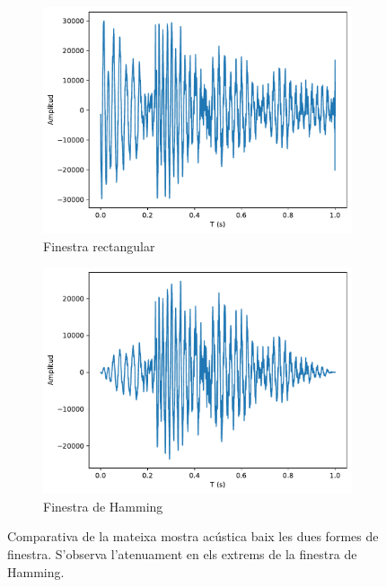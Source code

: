         \begin{figure}[!ht]
             \centering
             \begin{subfigure}{0.4\textwidth}
                 \centering
                 \includegraphics[width=\textwidth]{figuras/finestra_rect.pdf}
                 \caption{Finestra rectangular}
             \end{subfigure}
             \begin{subfigure}{0.4\textwidth}
                 \centering
                 \includegraphics[width=\textwidth]{figuras/finestra_hamm.pdf}
                 \caption{Finestra de Hamming}
             \end{subfigure}
             \caption{Comparativa de la mateixa mostra acústica baix les dues formes de finestra. S'observa l'atenuament en els extrems de la finestra de Hamming.}
             \label{fig:comparativa_finestres}
        \end{figure}



